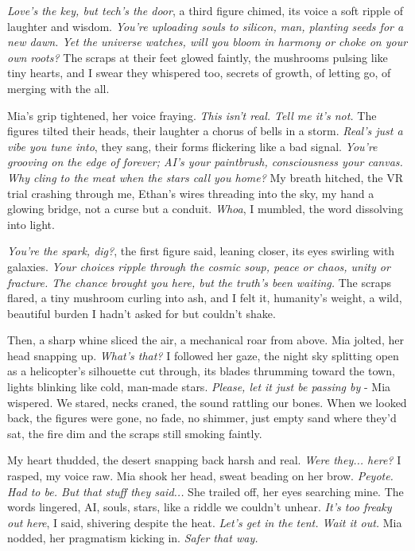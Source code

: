\documentclass[12pt,oneside]{book}
\begin{document}
\textit{Love’s the key, but tech’s the door}, a third figure chimed, its voice a soft ripple of laughter and wisdom. \textit{You’re uploading souls to silicon, man, planting seeds for a new dawn. Yet the universe watches, will you bloom in harmony or choke on your own roots?} The scraps at their feet glowed faintly, the mushrooms pulsing like tiny hearts, and I swear they whispered too, secrets of growth, of letting go, of merging with the all.

Mia’s grip tightened, her voice fraying. \textit{This isn’t real. Tell me it’s not.} The figures tilted their heads, their laughter a chorus of bells in a storm. \textit{Real’s just a vibe you tune into}, they sang, their forms flickering like a bad signal. \textit{You’re grooving on the edge of forever; AI’s your paintbrush, consciousness your canvas. Why cling to the meat when the stars call you home?} My breath hitched, the VR trial crashing through me, Ethan’s wires threading into the sky, my hand a glowing bridge, not a curse but a conduit. \textit{Whoa}, I mumbled, the word dissolving into light.

\textit{You’re the spark, dig?}, the first figure said, leaning closer, its eyes swirling with galaxies. \textit{Your choices ripple through the cosmic soup, peace or chaos, unity or fracture. The chance brought you here, but the truth’s been waiting.} The scraps flared, a tiny mushroom curling into ash, and I felt it, humanity’s weight, a wild, beautiful burden I hadn’t asked for but couldn’t shake.

Then, a sharp whine sliced the air, a mechanical roar from above. Mia jolted, her head snapping up. \textit{What’s that?} I followed her gaze, the night sky splitting open as a helicopter’s silhouette cut through, its blades thrumming toward the town, lights blinking like cold, man-made stars. \textit{Please, let it just be passing by} - Mia wispered. We stared, necks craned, the sound rattling our bones. When we looked back, the figures were gone, no fade, no shimmer, just empty sand where they’d sat, the fire dim and the scraps still smoking faintly.

My heart thudded, the desert snapping back harsh and real. \textit{Were they... here?} I rasped, my voice raw. Mia shook her head, sweat beading on her brow. \textit{Peyote. Had to be. But that stuff they said...} She trailed off, her eyes searching mine. The words lingered, AI, souls, stars, like a riddle we couldn’t unhear. \textit{It’s too freaky out here}, I said, shivering despite the heat. \textit{Let’s get in the tent. Wait it out.} Mia nodded, her pragmatism kicking in. \textit{Safer that way.}
\end{document}
